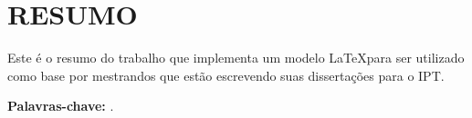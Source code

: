 \section*{RESUMO}

\noindent Este é o resumo do trabalho que implementa um modelo \LaTeX para ser utilizado como base por mestrandos que estão escrevendo suas dissertações para o IPT.

\bigskip

\noindent\textbf{Palavras-chave:} \thskeywords.
\pagebreak
